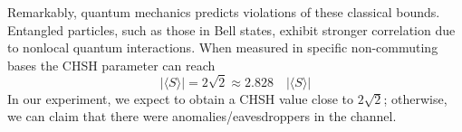 \documentclass[12pt]{article}
\begin{document}
Remarkably, quantum mechanics predicts violations of these classical bounds. Entangled particles, such as those in Bell states, exhibit stronger correlation due to nonlocal quantum interactions. When measured in specific non-commuting bases the CHSH parameter can reach
\[
  \left| \langle S \rangle \right| = 2\sqrt{2} \approx 2.828 \quad \left| \langle S \rangle \right|
\]
In our experiment, we expect to obtain a CHSH value close to \( 2\sqrt{2} \); otherwise, we can claim that there were anomalies/eavesdroppers in the channel.

\newpage


\end{document}
